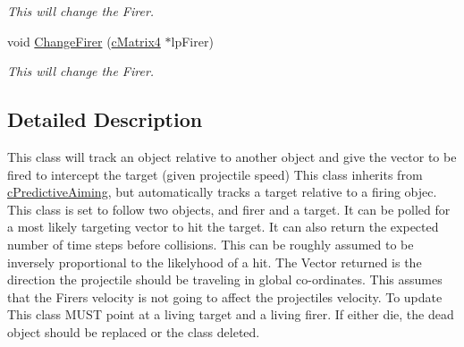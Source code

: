 \begin{DoxyCompactItemize}
\begin{DoxyCompactList}\small\item\em This will change the Firer. \end{DoxyCompactList}\item 
\hypertarget{classc_predictive_tracking_a78d56bcf03800ff5ad41f879d0fc3f23}{
void \hyperlink{classc_predictive_tracking_a78d56bcf03800ff5ad41f879d0fc3f23}{ChangeFirer} (\hyperlink{classc_matrix4}{cMatrix4} $\ast$lpFirer)}
\label{classc_predictive_tracking_a78d56bcf03800ff5ad41f879d0fc3f23}

\begin{DoxyCompactList}\small\item\em This will change the Firer. \end{DoxyCompactList}\end{DoxyCompactItemize}


\subsection{Detailed Description}
This class will track an object relative to another object and give the vector to be fired to intercept the target (given projectile speed) This class inherits from \hyperlink{classc_predictive_aiming}{cPredictiveAiming}, but automatically tracks a target relative to a firing objec. This class is set to follow two objects, and firer and a target. It can be polled for a most likely targeting vector to hit the target. It can also return the expected number of time steps before collisions. This can be roughly assumed to be inversely proportional to the likelyhood of a hit. The Vector returned is the direction the projectile should be traveling in global co-\/ordinates. This assumes that the Firers velocity is not going to affect the projectiles velocity. To update This class MUST point at a living target and a living firer. If either die, the dead object should be replaced or the class deleted. 